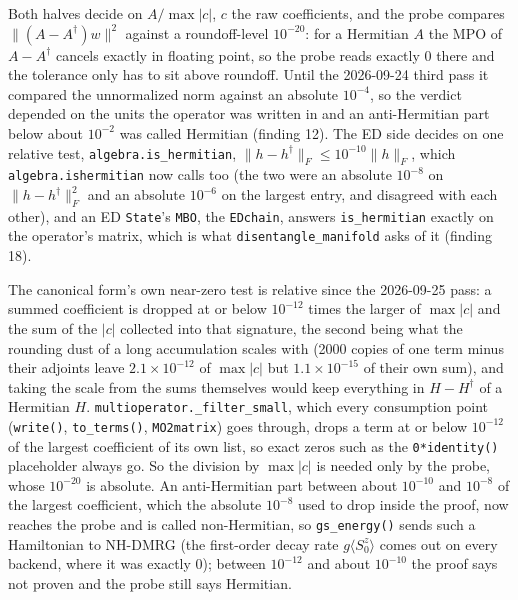 \documentclass[11pt]{article}
\begin{document}
Both halves decide on $A/\max|c|$, $c$ the raw coefficients, and the
probe compares $\lVert(A-A^\dagger)w\rVert^2$ against a roundoff-level
$10^{-20}$: for a Hermitian $A$ the MPO of $A-A^\dagger$ cancels exactly
in floating point, so the probe reads exactly 0 there and the tolerance
only has to sit above roundoff. Until the 2026-09-24 third pass it
compared the unnormalized norm against an absolute $10^{-4}$, so the
verdict depended on the units the operator was written in and an
anti-Hermitian part below about $10^{-2}$ was called Hermitian (finding
12). The ED side decides on one relative test,
\texttt{algebra.is\_hermitian},
$\lVert h-h^\dagger\rVert_F\le10^{-10}\lVert h\rVert_F$, which
\texttt{algebra.ishermitian} now calls too (the two were an absolute
$10^{-8}$ on $\lVert h-h^\dagger\rVert_F^2$ and an absolute $10^{-6}$ on
the largest entry, and disagreed with each other), and an ED
\texttt{State}'s \texttt{MBO}, the \texttt{EDchain}, answers
\texttt{is\_hermitian} exactly on the operator's matrix, which is what
\texttt{disentangle\_manifold} asks of it (finding 18).

The canonical form's own near-zero test is relative since the 2026-09-25
pass: a summed coefficient is dropped at or below $10^{-12}$ times the
larger of $\max|c|$ and the sum of the $|c|$ collected into that
signature, the second being what the rounding dust of a long
accumulation scales with (2000 copies of one term minus their adjoints
leave $2.1\times10^{-12}$ of $\max|c|$ but $1.1\times10^{-15}$ of their
own sum), and taking the scale from the sums themselves would keep
everything in $H-H^\dagger$ of a Hermitian $H$.
\texttt{multioperator.\_filter\_small}, which every consumption point
(\texttt{write()}, \texttt{to\_terms()}, \texttt{MO2matrix}) goes
through, drops a term at or below $10^{-12}$ of the largest coefficient
of its own list, so exact zeros such as the \texttt{0*identity()}
placeholder always go. So the division by $\max|c|$ is needed only by
the probe, whose $10^{-20}$ is absolute. An anti-Hermitian part between
about $10^{-10}$ and $10^{-8}$ of the largest coefficient, which the
absolute $10^{-8}$ used to drop inside the proof, now reaches the probe
and is called non-Hermitian, so \texttt{gs\_energy()} sends such a
Hamiltonian to NH-DMRG (the first-order decay rate
$g\langle S^z_0\rangle$ comes out on every backend, where it was exactly
0); between $10^{-12}$ and about $10^{-10}$ the proof says not proven
and the probe still says Hermitian.
\end{document}
